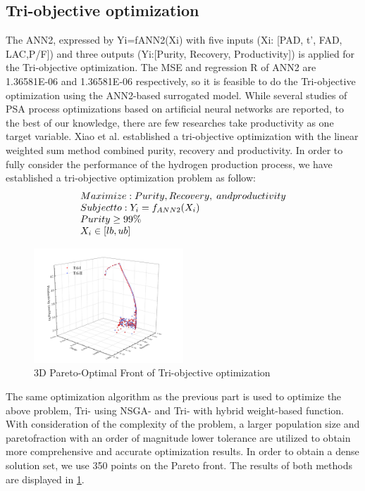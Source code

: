 \documentclass[preprint,12pt]{elsarticle}
\begin{document}
\subsection{Tri-objective optimization}
The ANN2, expressed by Yi=fANN2(Xi) with five inputs (Xi: [PAD, t’, FAD, LAC,P/F]) and three outputs (Yi:[Purity, Recovery, Productivity]) is applied for the Tri-objective optimization. The MSE and regression R of ANN2 are 1.36581E-06 and 1.36581E-06 respectively, so it is feasible to do the Tri-objective optimization using the ANN2-based surrogated model. While several studies of PSA process optimizations based on artificial neural networks are reported, to the best of our knowledge, there are few researches take productivity as one target variable. Xiao et al. established a tri-objective optimization with the linear weighted sum method combined purity, recovery and productivity\cite{RN19}. In order to fully consider the performance of the hydrogen production process, we have established a tri-objective optimization problem as follow:
\begin{displaymath}
	\begin{array}{l}
		Maximize:     Purity, Recovery,\;{\rm{ }}and{\rm{ }}productivity\\
		Subject to:      {Y_i} = {f_{ANN2}}({X_i})\\
		Purity \ge 99\% \\
		{X_i} \in [lb,ub] 
	\end{array}
\end{displaymath}
\begin{figure}
	\centering
	\includegraphics[width=0.5\textwidth]{figs/Fig12.pdf}
	\caption{3D Pareto-Optimal Front of Tri-objective optimization}
	\label{FIG:12}
\end{figure}
The same optimization algorithm as the previous part is used to optimize the above problem, Tri-\uppercase\expandafter{} using NSGA-\uppercase\expandafter{} and Tri-\uppercase\expandafter{} with hybrid weight-based function. With consideration of the complexity of the problem, a larger population size and paretofraction with an order of magnitude lower tolerance are utilized to obtain more comprehensive and accurate optimization results. In order to obtain a dense solution set, we use 350 points on the Pareto front. The results of both methods are displayed in \cref{FIG:12}.
\end{document}

